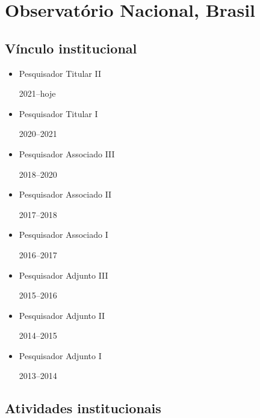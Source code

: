 \section{Observatório Nacional, Brasil}

\subsection*{Vínculo institucional}

\begin{itemize}
	\item[\parbox{0.03\textwidth}{\vspace{-0.3\baselineskip}\faClipboardList}]
	{Pesquisador Titular II \dotfill \parbox{0.11\textwidth}{\hfill 2021--hoje}} 
	\item[\parbox{0.03\textwidth}{\vspace{-0.3\baselineskip}\faClipboardCheck}]
	{Pesquisador Titular I \dotfill \parbox{0.11\textwidth}{\hfill 2020--2021}}
	\item[\parbox{0.03\textwidth}{\vspace{-0.3\baselineskip}\faClipboardCheck}]
	{Pesquisador Associado III \dotfill \parbox{0.11\textwidth}{\hfill 2018--2020}}
	\item[\parbox{0.03\textwidth}{\vspace{-0.3\baselineskip}\faClipboardCheck}]
	{Pesquisador Associado II \dotfill \parbox{0.11\textwidth}{\hfill 2017--2018}}
	\item[\parbox{0.03\textwidth}{\vspace{-0.3\baselineskip}\faClipboardCheck}]
	{Pesquisador Associado I \dotfill \parbox{0.11\textwidth}{\hfill 2016--2017}}
	\item[\parbox{0.03\textwidth}{\vspace{-0.3\baselineskip}\faClipboardCheck}]
	{Pesquisador Adjunto III \dotfill \parbox{0.11\textwidth}{\hfill 2015--2016}}
	\item[\parbox{0.03\textwidth}{\vspace{-0.3\baselineskip}\faClipboardCheck}]
	{Pesquisador Adjunto II \dotfill \parbox{0.11\textwidth}{\hfill 2014--2015}}
	\item[\parbox{0.03\textwidth}{\vspace{-0.3\baselineskip}\faClipboardCheck}]
	{Pesquisador Adjunto I \dotfill \parbox{0.11\textwidth}{\hfill 2013--2014}}
	
\end{itemize}

\subsection*{Atividades institucionais}

